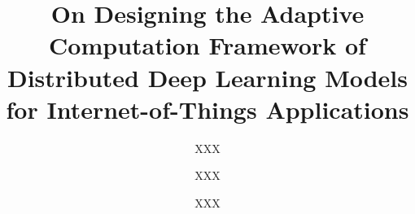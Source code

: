 \documentclass[format=acmsmall, review=false, screen=true]{acmart}
\begin{document}
\title[Adaptive Computation Framework for Distributed Deep Learning Models]{On Designing the Adaptive Computation Framework of Distributed Deep Learning Models for Internet-of-Things Applications}

\author{XXX}
\author{XXX}
\author{XXX}


\begin{abstract}


\end{abstract}
\end{document}
